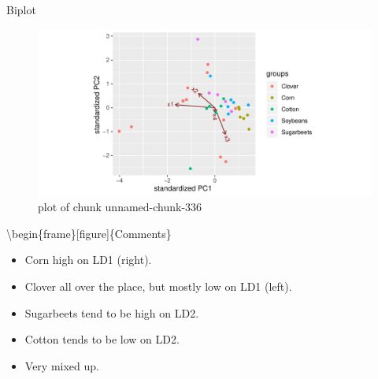 \documentclass[ignorenonframetext,]{beamer}
\newenvironment{Shaded}{\begin{snugshade}}{\end{snugshade}}
\newcommand{\DataTypeTok}[1]{\textcolor[rgb]{0.13,0.29,0.53}{#1}}
\newcommand{\KeywordTok}[1]{\textcolor[rgb]{0.13,0.29,0.53}{\textbf{#1}}}
\newcommand{\NormalTok}[1]{#1}
\newcommand{\OperatorTok}[1]{\textcolor[rgb]{0.81,0.36,0.00}{\textbf{#1}}}
\begin{document}
\begin{frame}[fragile]{Biplot}
\protect\hypertarget{biplot-1}{}

\begin{Shaded}
\end{Shaded}

\begin{figure}
\centering
\includegraphics{figure/unnamed-chunk-336-1.pdf}
\caption{plot of chunk unnamed-chunk-336}
\end{figure}

\textbackslash{}begin\{frame\}{[}figure{]}\{Comments\}

\begin{itemize}
\item
  Corn high on LD1 (right).
\item
  Clover all over the place, but mostly low on LD1 (left).
\item
  Sugarbeets tend to be high on LD2.
\item
  Cotton tends to be low on LD2.
\item
  Very mixed up.
\end{itemize}

\end{frame}
\end{document}
